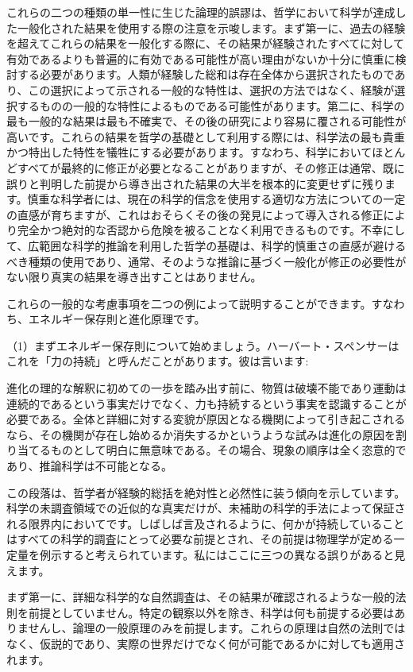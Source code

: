 \documentclass[a4paper,11pt,openany]{ltjsbook}
\begin{document}
これらの二つの種類の単一性に生じた論理的誤謬は、哲学において科学が達成した一般化された結果を使用する際の注意を示唆します。まず第一に、過去の経験を超えてこれらの結果を一般化する際に、その結果が経験されたすべてに対して有効であるよりも普遍的に有効である可能性が高い理由がないか十分に慎重に検討する必要があります。人類が経験した総和は存在全体から選択されたものであり、この選択によって示される一般的な特性は、選択の方法ではなく、経験が選択するものの一般的な特性によるものである可能性があります。第二に、科学の最も一般的な結果は最も不確実で、その後の研究により容易に覆される可能性が高いです。これらの結果を哲学の基礎として利用する際には、科学法の最も貴重かつ特出した特性を犠牲にする必要があります。すなわち、科学においてほとんどすべてが最終的に修正が必要となることがありますが、その修正は通常、既に誤りと判明した前提から導き出された結果の大半を根本的に変更せずに残ります。慎重な科学者には、現在の科学的信念を使用する適切な方法についての一定の直感が育ちますが、これはおそらくその後の発見によって導入される修正により完全かつ絶対的な否認から危険を被ることなく利用できるものです。不幸にして、広範囲な科学的推論を利用した哲学の基礎は、科学的慎重さの直感が避けるべき種類の使用であり、通常、そのような推論に基づく一般化が修正の必要性がない限り真実の結果を導き出すことはありません。

これらの一般的な考慮事項を二つの例によって説明することができます。すなわち、エネルギー保存則と進化原理です。

（1）まずエネルギー保存則について始めましょう。ハーバート・スペンサーはこれを「力の持続」と呼んだことがあります。彼は言います:

進化の理的な解釈に初めての一歩を踏み出す前に、物質は破壊不能であり運動は連続的であるという事実だけでなく、力も持続するという事実を認識することが必要である。全体と詳細に対する変貌が原因となる機関によって引き起こされるなら、その機関が存在し始めるか消失するかというような試みは進化の原因を割り当てるものとして明白に無意味である。その場合、現象の順序は全く恣意的であり、推論科学は不可能となる。

この段落は、哲学者が経験的総括を絶対性と必然性に装う傾向を示しています。科学の未調査領域での近似的な真実だけが、未補助の科学的手法によって保証される限界内においてです。しばしば言及されるように、何かが持続していることはすべての科学的調査にとって必要な前提とされ、その前提は物理学が定める一定量を例示すると考えられています。私にはここに三つの異なる誤りがあると見えます。

まず第一に、詳細な科学的な自然調査は、その結果が確認されるような一般的法則を前提としていません。特定の観察以外を除き、科学は何も前提する必要はありませんし、論理の一般原理のみを前提します。これらの原理は自然の法則ではなく、仮説的であり、実際の世界だけでなく何が可能であるかに対しても適用されます。
\end{document}
